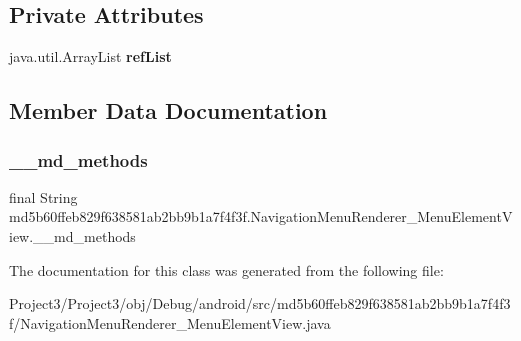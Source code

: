 \subsection*{Private Attributes}
\begin{DoxyCompactItemize}
\item 
\mbox{\label{classmd5b60ffeb829f638581ab2bb9b1a7f4f3f_1_1NavigationMenuRenderer__MenuElementView_a87d2c9304a1e94e25442bab9d20cb5a8}} 
java.\+util.\+Array\+List {\bfseries ref\+List}
\end{DoxyCompactItemize}


\subsection{Member Data Documentation}
\mbox{\label{classmd5b60ffeb829f638581ab2bb9b1a7f4f3f_1_1NavigationMenuRenderer__MenuElementView_a04d38a07cbc75040c62aaa944c9b4174}} 
\subsubsection{\texorpdfstring{\+\_\+\+\_\+md\+\_\+methods}{\_\_md\_methods}}
{\footnotesize\ttfamily final String md5b60ffeb829f638581ab2bb9b1a7f4f3f.\+Navigation\+Menu\+Renderer\+\_\+\+Menu\+Element\+View.\+\_\+\+\_\+md\+\_\+methods\hspace{0.3cm}{\ttfamily [static]}}



The documentation for this class was generated from the following file\+:\begin{DoxyCompactItemize}
\item 
Project3/\+Project3/obj/\+Debug/android/src/md5b60ffeb829f638581ab2bb9b1a7f4f3f/Navigation\+Menu\+Renderer\+\_\+\+Menu\+Element\+View.\+java\end{DoxyCompactItemize}
